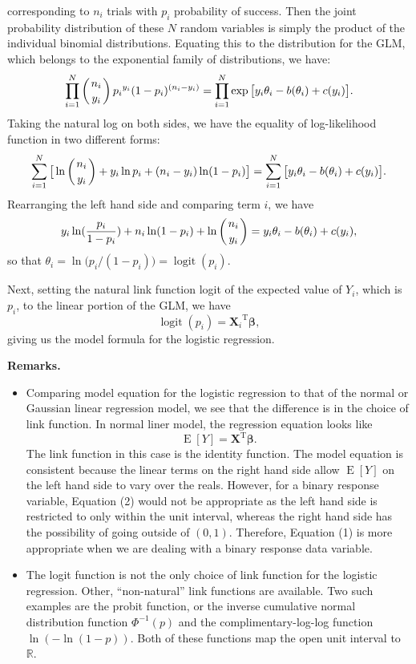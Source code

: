 \documentclass[12pt]{article}
\begin{document}
corresponding to $n_i$ trials with $p_i$ probability of success.  Then the joint probability distribution of these $N$ 
random variables is simply the product of the individual binomial distributions.  Equating this to the distribution for 
the GLM, which belongs to the exponential family of distributions, we have:
$$\prod_{i=1}^{N}\left({n_i\atop y_i}\right){p_i}^{y_i}(1-p_i)^{(n_i-y_i)} =\prod_{i=1}^{N}\operatorname{exp}\big[y_i\theta_i-b(\theta_i)+c(y_i)\big].$$
Taking the natural log on both sides, we have the equality of log-likelihood function in two different forms:
$$\sum_{i=1}^{N}\big[\ln\left({n_i\atop y_i}\right)+y_i\ln p_i+(n_i-y_i) \ln(1-p_i)\big]=\sum_{i=1}^{N}\big[y_i\theta_i-b(\theta_i)+c(y_i)\big].$$
Rearranging the left hand side and comparing term $i$, we have
$$y_i\ln(\frac{p_i}{1-p_i})+n_i\ln(1-p_i)+\ln\left({n_i\atop y_i}\right)=y_i\theta_i-b(\theta_i)+c(y_i),$$
so that $\theta_i=\ln\big(p_i/(1-p_i)\big)=\operatorname{logit}(p_i)$.
\par
Next, setting the natural link function logit of the expected value of $Y_i$, which is $p_i$, to the linear portion of 
the GLM, we have $$\operatorname{logit}(p_i)={\boldsymbol{X}_i}^{\operatorname{T}}\boldsymbol{\beta},$$
giving us the model formula for the logistic regression.  
\par
\textbf{Remarks.}
\begin{itemize}
\item Comparing model equation for the logistic regression to that of the normal or Gaussian linear regression model, we 
see that the difference is in the choice of link function.  In normal liner model, the regression equation looks like 
\begin{equation} \operatorname{E}[Y]=\boldsymbol{X}^{\operatorname{T}}\boldsymbol{\beta}. \end{equation}
The link function in this case is the identity function.  The model equation is consistent because the linear terms on 
the right hand side allow $\operatorname{E}[Y]$ on the left hand side to vary over the reals.  However, for a binary 
response variable, Equation (2) would not be appropriate as the left hand side is restricted to only within the unit 
interval, whereas the right hand side has the possibility of going outside of $(0,1)$.  Therefore, Equation (1) is more 
appropriate when we are dealing with a binary response data variable.
\item The logit function is not the only choice of link function for the logistic regression.  Other, ``non-natural'' 
link functions are available.  Two such examples are the probit function, or the inverse cumulative normal distribution 
function $\Phi^{-1}(p)$ and the complimentary-log-log function $\ln(-\ln(1-p))$.  Both of these functions map the open 
unit interval to $\mathbb{R}$.
\end{itemize}
\end{document}
